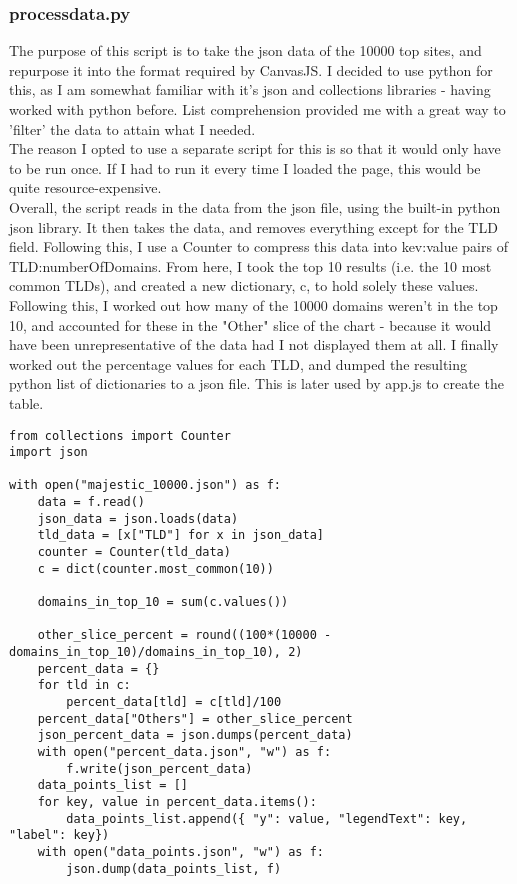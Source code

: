 \documentclass{article}
\begin{document}
\subsubsection{processdata.py}
The purpose of this script is to take the json data of the 10000 top sites, and repurpose it into the format required by CanvasJS. I decided to use python for this, as I am somewhat familiar with it's json and collections libraries - having worked with python before. List comprehension provided me with a great way to 'filter' the data to attain what I needed. 
\\ \newline
The reason I opted to use a separate script for this is so that it would only have to be run once. If I had to run it every time I loaded the page, this would be quite resource-expensive.  
\\ \newline
Overall, the script reads in the data from the json file, using the built-in python json library. It then takes the data, and removes everything except for the TLD field. Following this, I use a Counter to compress this data into kev:value pairs of TLD:numberOfDomains. From here, I took the top 10 results (i.e. the 10 most common TLDs), and created a new dictionary, c, to hold solely these values. 
\\ \newline 
Following this, I worked out how many of the 10000 domains weren't in the top 10, and accounted for these in the "Other" slice of the chart - because it would have been unrepresentative of the data had I not displayed them at all. I finally worked out the percentage values for each TLD, and dumped the resulting python list of dictionaries to a json file. This is later used by app.js to create the table.

\begin{lstlisting}
from collections import Counter
import json

with open("majestic_10000.json") as f:
    data = f.read()
    json_data = json.loads(data)
    tld_data = [x["TLD"] for x in json_data]
    counter = Counter(tld_data)
    c = dict(counter.most_common(10))

    domains_in_top_10 = sum(c.values())

    other_slice_percent = round((100*(10000 - domains_in_top_10)/domains_in_top_10), 2)
    percent_data = {}
    for tld in c:
        percent_data[tld] = c[tld]/100
    percent_data["Others"] = other_slice_percent
    json_percent_data = json.dumps(percent_data)
    with open("percent_data.json", "w") as f:
        f.write(json_percent_data)
    data_points_list = []
    for key, value in percent_data.items():
        data_points_list.append({ "y": value, "legendText": key, "label": key})
    with open("data_points.json", "w") as f:
        json.dump(data_points_list, f)

\end{lstlisting}
\end{document}
